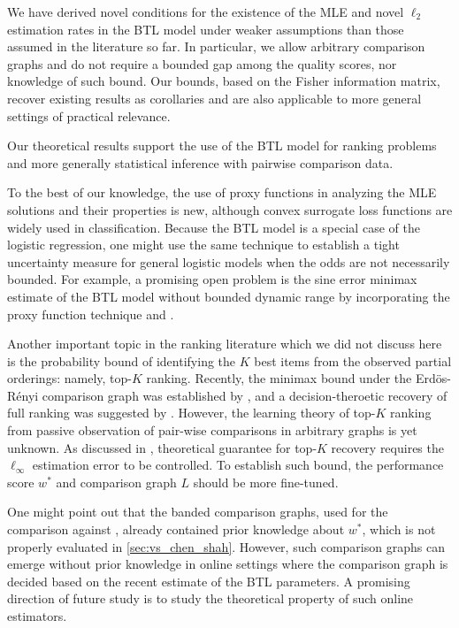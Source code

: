 We have derived novel conditions for the existence of the MLE and novel $\ell_2$ estimation rates in the BTL model under weaker assumptions than those assumed in the literature so far. In particular, we allow arbitrary comparison graphs and do not require a bounded gap among the quality scores, nor knowledge of such bound. Our bounds, based on the Fisher information matrix, recover existing results as corollaries and are also applicable to more general settings of practical relevance. 

Our theoretical results support the use of the BTL model for ranking problems and more generally statistical inference with pairwise comparison data. 

To the best of our knowledge, the use of proxy functions in analyzing the MLE solutions and their properties is new, although convex surrogate loss functions are widely used in classification. Because the BTL model is a special case of the logistic regression, one might use the same technique to establish a tight uncertainty measure for general logistic models when the odds are not necessarily bounded. For example, a promising open problem is the sine error minimax estimate of the BTL model without bounded dynamic range by incorporating the proxy function technique and \citet{hendrickx2019graph}.

Another important topic in the ranking literature which we did not  discuss here is the probability bound of identifying the $K$ best items from the observed partial orderings: namely, top-$K$ ranking. Recently, the minimax bound under the Erd\"os-R\'enyi comparison graph was established by \citet{chen2020partial,chen2019spectralregmletopk}, and a decision-theroetic recovery of full ranking was suggested by \citet{chen2021full}. However, the learning theory of top-$K$ ranking from passive observation of pair-wise comparisons in arbitrary graphs is yet unknown. As discussed in \citet{chen2020partial}, theoretical guarantee for top-$K$ recovery requires the $\ell_\infty$ estimation error to be controlled. To establish such bound, the performance score $w^*$ and comparison graph $L$ should be more fine-tuned. 

One might point out that the banded comparison graphs, used for the comparison against \citet{shah2016estimation}, already contained prior knowledge about $w^*$, which is not properly evaluated in \ref{sec:vs_chen_shah}. However, such comparison graphs can emerge without prior knowledge in online settings where the comparison graph is decided based on the recent estimate of the BTL parameters. A promising direction of future study is to study the theoretical property of such online estimators.


